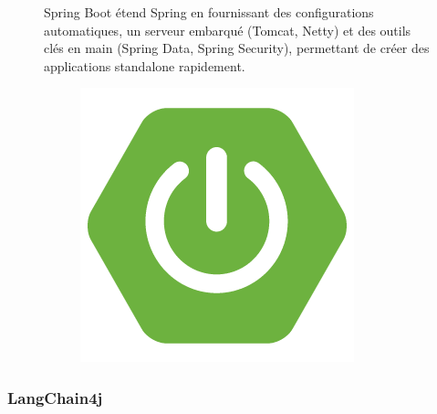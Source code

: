 \documentclass[12pt,a4paper]{report}
\begin{document}
	\begin{figure}[H]
		\begin{minipage}{0.8\textwidth}
			Spring Boot étend Spring en fournissant des configurations automatiques, un serveur embarqué (Tomcat, Netty) et des outils clés en main (Spring Data, Spring Security), permettant de créer des applications standalone rapidement.
		\end{minipage}
		\hfill
		\begin{minipage}{0.15\textwidth} 
			\begin{figure}[H]
				\centering
				\includegraphics[width=\linewidth]{spring-boot-logo.png}
				\label{fig:spring-boot-logo}
			\end{figure}
		\end{minipage}
	\end{figure}
	
	
	\subsubsection{LangChain4j}
	
\end{document}
